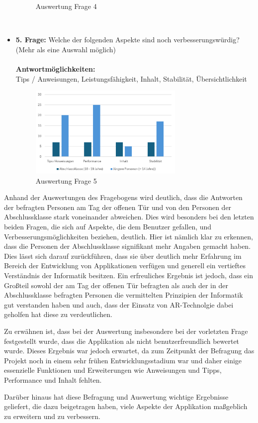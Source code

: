 \begin{itemize}
\begin{figure}[H]
        \caption{Auswertung Frage 4}
        \label{fig:fr4}
    \end{figure}
    \\
    \item \textbf{5. Frage:} Welche der folgenden Aspekte sind noch verbesserungswürdig? (Mehr als eine Auswahl möglich)
    \\
    \\
    \textbf{Antwortmöglichkeiten:}\\
    Tips / Anweisungen, Leistungsfähigkeit, Inhalt, Stabilität, Übersichtlichkeit
    \\
    \begin{figure}[h]
        \centering
        \includegraphics[width=0.7\textwidth]{images/AuswertungFrage5}
        \caption{Auswertung Frage 5}
        \label{fig:fr5}
    \end{figure}
\end{itemize}

Anhand der Auswertungen des Fragebogens wird deutlich, dass die Antworten der befragten Personen am Tag der offenen Tür
und von den Personen der Abschlussklasse stark voneinander abweichen. Dies wird besonders bei den letzten beiden Fragen,
die sich auf Aspekte, die dem Benutzer gefallen, und Verbesserungsmöglichkeiten beziehen, deutlich. Hier ist nämlich klar
zu erkennen, dass die Personen der Abschlussklasse signifikant mehr Angaben gemacht haben. Dies lässt sich darauf
zurückführen, dass sie über deutlich mehr Erfahrung im Bereich der Entwicklung von Applikationen verfügen und generell
ein vertieftes Verständnis der Informatik besitzen. Ein erfreuliches Ergebnis ist jedoch, dass ein Großteil sowohl der
am Tag der offenen Tür befragten als auch der in der Abschlussklasse befragten Personen die vermittelten Prinzipien der
Informatik gut verstanden haben und auch, dass der Einsatz von AR-Technolgie dabei geholfen hat diese zu verdeutlichen.

Zu erwähnen ist, dass bei der Auswertung insbesondere bei der vorletzten Frage festgestellt wurde, dass die Applikation
als nicht benutzerfreundlich bewertet wurde. Dieses Ergebnis war jedoch erwartet, da zum Zeitpunkt der Befragung das Projekt
noch in einem sehr frühen Entwicklungsstadium war und daher einige essenzielle Funktionen und Erweiterungen wie Anweisungen
und Tipps, Performance und Inhalt fehlten.

Darüber hinaus hat diese Befragung und Auswertung wichtige Ergebnisse geliefert, die dazu beigetragen haben, viele Aspekte
der Applikation maßgeblich zu erweitern und zu verbessern.